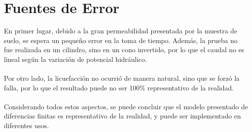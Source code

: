 \section{Fuentes de Error}

En primer lugar, debido a la gran permeabilidad presentada por la muestra de suelo, se espera un pequeño error en la toma de tiempo. Además, la prueba no fue realizada en un cilindro, sino en un cono invertido, por lo que el caudal no es lineal según la variación de potencial hidráulico.
\\ \\
Por otro lado, la licuefacción no ocurrió de manera natural, sino que se forzó la falla, por lo que el resultado puede no ser 100\% representativo de la realidad.
\\ \\
Considerando todos estos aspectos, se puede concluir que el modelo presentado de diferencias finitas es representativo de la realidad, y puede ser implementado en diferentes usos.
